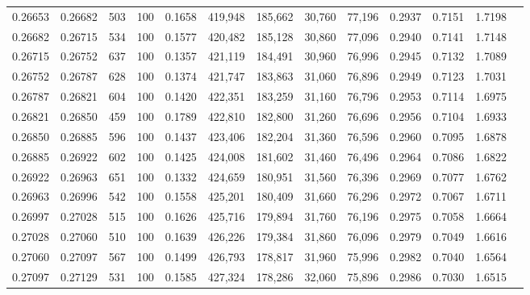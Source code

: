 \begin{tabular}{rrrrrrrrrrrrr}
0.26653 & 0.26682 &   503 & 100 &                                     0.1658 & 419,948 & 185,662 &  30,760 &  77,196 & 0.2937 & 0.7151 & 1.7198 \\
0.26682 & 0.26715 &   534 & 100 &                                     0.1577 & 420,482 & 185,128 &  30,860 &  77,096 & 0.2940 & 0.7141 & 1.7148 \\
0.26715 & 0.26752 &   637 & 100 &                                     0.1357 & 421,119 & 184,491 &  30,960 &  76,996 & 0.2945 & 0.7132 & 1.7089 \\
0.26752 & 0.26787 &   628 & 100 &                                     0.1374 & 421,747 & 183,863 &  31,060 &  76,896 & 0.2949 & 0.7123 & 1.7031 \\
0.26787 & 0.26821 &   604 & 100 &                                     0.1420 & 422,351 & 183,259 &  31,160 &  76,796 & 0.2953 & 0.7114 & 1.6975 \\
0.26821 & 0.26850 &   459 & 100 &                                     0.1789 & 422,810 & 182,800 &  31,260 &  76,696 & 0.2956 & 0.7104 & 1.6933 \\
0.26850 & 0.26885 &   596 & 100 &                                     0.1437 & 423,406 & 182,204 &  31,360 &  76,596 & 0.2960 & 0.7095 & 1.6878 \\
0.26885 & 0.26922 &   602 & 100 &                                     0.1425 & 424,008 & 181,602 &  31,460 &  76,496 & 0.2964 & 0.7086 & 1.6822 \\
0.26922 & 0.26963 &   651 & 100 &                                     0.1332 & 424,659 & 180,951 &  31,560 &  76,396 & 0.2969 & 0.7077 & 1.6762 \\
0.26963 & 0.26996 &   542 & 100 &                                     0.1558 & 425,201 & 180,409 &  31,660 &  76,296 & 0.2972 & 0.7067 & 1.6711 \\
0.26997 & 0.27028 &   515 & 100 &                                     0.1626 & 425,716 & 179,894 &  31,760 &  76,196 & 0.2975 & 0.7058 & 1.6664 \\
0.27028 & 0.27060 &   510 & 100 &                                     0.1639 & 426,226 & 179,384 &  31,860 &  76,096 & 0.2979 & 0.7049 & 1.6616 \\
0.27060 & 0.27097 &   567 & 100 &                                     0.1499 & 426,793 & 178,817 &  31,960 &  75,996 & 0.2982 & 0.7040 & 1.6564 \\
0.27097 & 0.27129 &   531 & 100 &                                     0.1585 & 427,324 & 178,286 &  32,060 &  75,896 & 0.2986 & 0.7030 & 1.6515 \\

\end{tabular}
